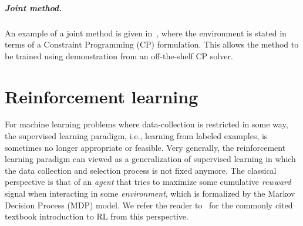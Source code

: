 \documentclass[a4paper]{report}
\theoremstyle{definition}
\theoremstyle{plain}
\begin{document}
\paragraph{Joint method.}
An example of a joint method is given
in~\cite{tasselEndEndReinforcementLearning2023}, where the environment is stated
in terms of a Constraint Programming (CP) formulation. This allows the method to
be trained using demonstration from an off-the-shelf CP solver.


\chapter{Reinforcement learning}

For machine learning problems where data-collection is restricted in some way,
the supervised learning paradigm, i.e., learning from labeled examples, is
sometimes no longer appropriate or feasible.
%
Very generally, the reinforcement learning paradigm can viewed as a
generalization of supervised learning in which the data collection and selection
process is not fixed anymore.
%
The classical perspective is that of an \emph{agent} that tries to maximize some
cumulative \emph{rewward} signal when interacting in some \emph{environment},
which is formalized by the Markov Decision Process (MDP) model.
%
We refer the reader to~\cite{suttonReinforcementLearningIntroduction2018} for the commonly cited textbook introduction to RL
from this perspective.
\end{document}
